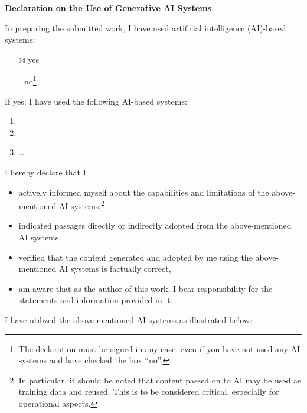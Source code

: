 {%
{\LARGE\textsf{\textbf{Declaration on the Use of Generative AI Systems}}\bigskip}

In preparing the submitted work, I have used artificial intelligence (AI)-based systems:

\begin{enumerate}
\item[$\boxtimes$] yes
\item[$\square$] no\footnote{%
The declaration must be signed in any case, even if you have not used any AI systems and have checked the box \enquote{no}.}
\end{enumerate}


If yes: I have used the following AI-based systems:


\begin{enumerate}
\item
\item
\item \ldots
\end{enumerate}

I hereby declare that I

\begin{itemize}
  \item actively informed myself about the capabilities and limitations of the above-mentioned AI systems,\footnote{In particular, it should be noted that content passed on to AI may be used as training data and reused. This is to be considered critical, especially for operational aspects.}
  \item indicated passages directly or indirectly adopted from the above-mentioned AI systems,
%
%
  \item verified that the content generated and adopted by me using the above-mentioned AI systems is factually correct,
  \item am aware that as the author of this work, I bear responsibility for the statements and information provided in it.
\end{itemize}

I have utilized the above-mentioned AI systems as illustrated below: 

}

